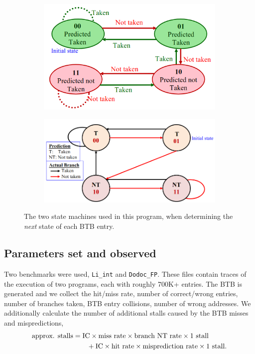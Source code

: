 \documentclass{article}
\begin{document}
	\begin{figure}[h]
		\centering
		\begin{subfigure}{0.45\textwidth}
			\includegraphics[width=\linewidth]{statemachineClass}
			\caption{}
			\label{subfig:class}
		\end{subfigure}
		\hfil
		\begin{subfigure}{0.45\linewidth}
			\includegraphics[width=\linewidth]{statemachineB}
			\caption{}
			\label{subfig:a}
		\end{subfigure}
		\caption{The two state machines used in this program, when determining the \textit{next} state of each BTB entry.}
		\label{fig:statemachinea}
	\end{figure}
	
	\pagebreak
	
	\subsection*{Parameters set and observed}
	Two benchmarks were used, \texttt{Li\_int} and \texttt{Dodoc\_FP}. These files contain traces of the execution of two programs, each with roughly 700K+ entries. The BTB is generated and we collect the hit/miss rate, number of correct/wrong entries, number of branches taken, BTB entry collisions, number of wrong addresses. We additionally calculate the number of additional stalls caused by the BTB misses and mispredictions, \begin{align}
		\text{approx. stalls} & = \text{IC} \times  \text{miss rate} \times \text{branch NT rate} \times 1 \text{ stall} \label{eq:stall} \\
			& \qquad + \text{IC} \times \text{hit rate} \times \text{misprediction rate} \times 1 \text{ stall}. \notag
	\end{align}
	
\end{document}
